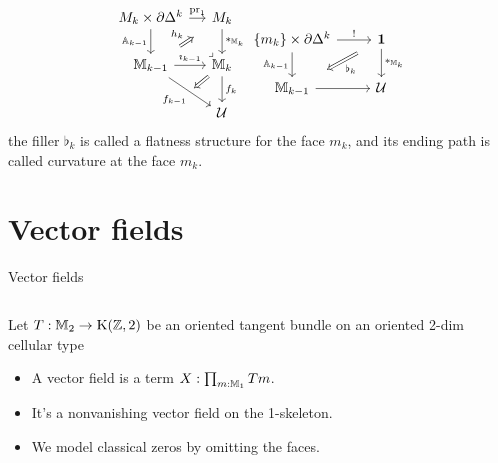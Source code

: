 \documentclass[14pt,aspectratio=169]{beamer}
\renewcommand{\defemph}[1]{\alert{#1}}
\begin{document}
\begin{frame}
\begin{mydef}
\[\begin{tikzcd}[ampersand replacement=\&, column sep=small]
  {M_k\times \partial\Delta^k} \& {M_k} \\
  {\mathbb{M}_{k-1}} \& {\mathbb{M}_k} \\
  \& {\mathcal{U}}
  \arrow["{\mathrm{pr}_1}", from=1-1, to=1-2]
  \arrow["{\mathbb{A}_{k-1}}"', from=1-1, to=2-1]
  \arrow["{*_{\mathbb{M}_k}}", from=1-2, to=2-2]
  \arrow["{h_k}", shorten <=10pt, shorten >=10pt, Rightarrow, from=2-1, to=1-2]
  \arrow["{\imath_{k-1}}", from=2-1, to=2-2]
  \arrow[""{name=0, anchor=center, inner sep=0}, "{f_{k-1}}"', from=2-1, to=3-2]
  \arrow["\ulcorner"{pos=-0.05, rotate=180}, shift left=1.5, draw=none, from=2-2, to=1-1]
  \arrow["{f_k}", from=2-2, to=3-2]
  \arrow[shorten >=3pt, Rightarrow, from=2-2, to=0]
\end{tikzcd}
\begin{tikzcd}[ampersand replacement=\&]
  {\{m_k\}\times \partial\Delta^k} \& \unit \\
  {\mathbb{M}_{k-1}} \& {\mathcal{U}}
  \arrow["{!}", from=1-1, to=1-2]
  \arrow["{\mathbb{A}_{k-1}}"', from=1-1, to=2-1]
  \arrow["{*_{\mathbb{M}_k}}", from=1-2, to=2-2]
  \arrow["{\flat_k}", shorten <=11pt, shorten >=11pt, Rightarrow, from=1-2, to=2-1]
  \arrow[from=2-1, to=2-2]
\end{tikzcd}\]
the filler \( \flat_k \) is called a \defemph{flatness structure for the face \( m_k \)}, and its ending path is called \defemph{curvature at the face \( m_k \)}.
\end{mydef}
\end{frame}

\section{Vector fields}
\begin{frame}{Vector fields}
\begin{columns}
\begin{column}{0.7\textwidth}
Let \( T:\mathbb{M}_2\to\mathrm{K}(\mathbb{Z},2) \) be an oriented tangent bundle on an oriented 2-dim cellular type
\begin{itemize}
\item A \alert{vector field} is a term \( X:\prod_{m:\mathbb{M}_1}Tm \).
\item It's a \alert{nonvanishing} vector field on the 1-skeleton.
\item We model classical zeros by omitting the faces.
\end{itemize}
\end{column}
\begin{column}{0.3\textwidth}

\end{column}
\end{columns}
\end{frame}
\end{document}
